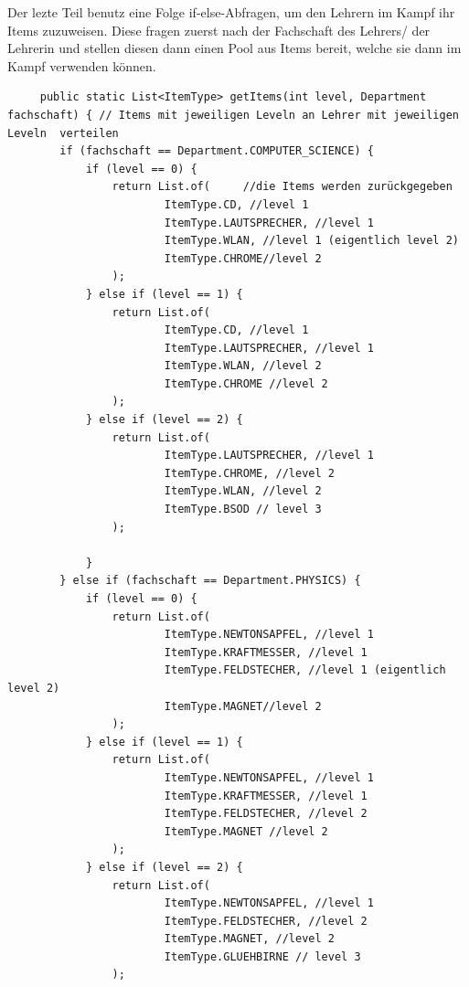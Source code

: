 Der lezte Teil benutz eine Folge if-else-Abfragen, um den Lehrern im Kampf ihr Items zuzuweisen. Diese fragen zuerst nach der Fachschaft des Lehrers/ der Lehrerin und stellen diesen dann einen Pool aus Items bereit, welche sie dann im Kampf verwenden können.
\\
\begin{lstlisting}
     public static List<ItemType> getItems(int level, Department fachschaft) { // Items mit jeweiligen Leveln an Lehrer mit jeweiligen Leveln  verteilen
        if (fachschaft == Department.COMPUTER_SCIENCE) {
            if (level == 0) {
                return List.of(     //die Items werden zurückgegeben
                        ItemType.CD, //level 1
                        ItemType.LAUTSPRECHER, //level 1
                        ItemType.WLAN, //level 1 (eigentlich level 2)
                        ItemType.CHROME//level 2
                );
            } else if (level == 1) {
                return List.of(
                        ItemType.CD, //level 1
                        ItemType.LAUTSPRECHER, //level 1
                        ItemType.WLAN, //level 2
                        ItemType.CHROME //level 2
                );
            } else if (level == 2) {
                return List.of(
                        ItemType.LAUTSPRECHER, //level 1
                        ItemType.CHROME, //level 2
                        ItemType.WLAN, //level 2
                        ItemType.BSOD // level 3
                );

            }
        } else if (fachschaft == Department.PHYSICS) {
            if (level == 0) {
                return List.of(
                        ItemType.NEWTONSAPFEL, //level 1
                        ItemType.KRAFTMESSER, //level 1
                        ItemType.FELDSTECHER, //level 1 (eigentlich level 2)
                        ItemType.MAGNET//level 2
                );
            } else if (level == 1) {
                return List.of(
                        ItemType.NEWTONSAPFEL, //level 1
                        ItemType.KRAFTMESSER, //level 1
                        ItemType.FELDSTECHER, //level 2
                        ItemType.MAGNET //level 2
                );
            } else if (level == 2) {
                return List.of(
                        ItemType.NEWTONSAPFEL, //level 1
                        ItemType.FELDSTECHER, //level 2
                        ItemType.MAGNET, //level 2
                        ItemType.GLUEHBIRNE // level 3
                );


\end{lstlisting}
